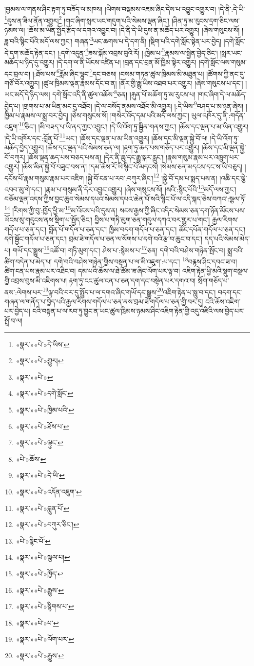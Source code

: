།བྱམས་ལ་གནས་ཤིང་རྟག་ཏུ་བཟོད་ལ་མཁས། །ལེགས་བསྡམས་འཇམ་ཞིང་དེས་པ་འབྱུང་འགྱུར་བ། །དེ་ནི་:དེ་ཡི་\footnote{«སྣར་»«པེ་»དེ་ཡིས་}དུས་ན་ཟིལ་ནོན་འགྱུར།\footnote{«སྣར་»«པེ་»གྱུར།} །གང་ཞིག་སླར་ཡང་གདུག་པའི་སེམས་ལྡན་ཞིང་། །ཤིན་ཏུ་མ་རུངས་དྲག་ཅིང་ལས་ཉམས་ལ། །ཆོས་མ་ཡིན་སྤྱོད་རྩོད་ལ་དགའ་འབྱུང་བ། །དེ་ནི་དེ་ཡི་དུས་ན་མཆོད་པར་འགྱུར། །ཞེས་གསུངས་སོ། །
ཟླ་བའི་སྙིང་པོའི་མདོ་ལས་ཀྱང་། གཞན་\footnote{«སྣར་»«པེ་»}ཡང་ཆགས་པ་དེ་དག་ནི། །སྡིག་པའི་དགེ་སློང་སྟེན་པར་བྱེད། །དགེ་སློང་དེ་དག་མཆོད་རྟེན་དང་། །:དགེ་འདུན་\footnote{«སྣར་»«པེ་»དགེ་སློང་}ཟས་སྐོམ་འབྲས་བུའི་རོ། །:ཁྱིམ་པ་\footnote{«སྣར་»«པེ་»ཁྱིམ་པའི་}རྣམས་ལ་སྦྱིན་བྱེད་ཅིང་། །སླར་ཡང་མཆོད་པ་ཉིད་དུ་འགྱུར། །དེ་དག་ལ་ནི་ཡོངས་འཛིན་པ། །བྲན་དང་བྲན་མོ་ཁྱིམ་སྟེར་འགྱུར། །དགེ་སློང་ལས་གསུམ་དང་བྲལ་བ། །:ཐོས་པས་\footnote{«སྣར་»«པེ་»ཐོས་པ་}རློམ་ཞིང་ལྷུང་\footnote{«སྣར་»«པེ་»ལྟུང་}དང་བཅས། །བསམ་གཏན་ཚུལ་ཁྲིམས་མི་མཐུན་པ། །ཚོགས་ཀྱི་ནང་དུ་གཙོ་བོར་འགྱུར། །ཚུལ་ཁྲིམས་ལྡན་རྣམས་དོང་བ་ན། །ནོར་གྱི་རྒྱུ་ཡིས་འཐབ་པར་འགྱུར། །ཞེས་གསུངས་པ་དང་། །ཡང་མདོ་དེ་ཉིད་ལས། དགེ་སློང་འདི་ནི་ཚུལ་འཆོས་\footnote{«པེ་»ཆོས་}ཅན། །རྐུན་པོ་མཆོག་ཏུ་མ་རུངས་པ། །གང་ཞིག་དེ་ལ་མཆོད་བྱེད་པ། །གྲགས་པ་མ་ཡིན་མང་དུ་འཐོབ། །དེ་ལ་བསོད་ནམས་འཐོབ་མི་འགྱུར། །:དེ་ཡིས་\footnote{«སྣར་»«པེ་»དེ་ཡི་}བཤད་པ་མ་ཉན་ཞེས། །ཁྱིམ་པ་རྣམས་ལ་སྨྲ་བར་བྱེད། །ཅེས་གསུངས་སོ། །གསེར་འོད་དམ་པའི་མདོ་ལས་ཀྱང་། ཡུལ་འཁོར་དུ་ནི་:གདོན་འཇུག་\footnote{«སྣར་»«པེ་»འདོན་འཇུག་}ཅིང་། །མི་བཟད་པ་ཡི་ནད་ཀྱང་འབྱུང་། །དེ་ཡི་འོག་ཏུ་སྦྱིན་གནས་ཀྱང་། །ཆོས་དང་ལྡན་པ་མ་ཡིན་འགྱུར། །དེ་ཡི་འཁོར་དང་:བློན་པོ་\footnote{«སྣར་»«པེ་»བླུན་པོ་}ཡང་། །ཆོས་དང་ལྡན་པ་མ་ཡིན་འགྱུར། །ཆོས་དང་མི་ལྡན་སྐྱེ་བོ་ལ། །དེ་ཡི་འོག་ཏུ་མཆོད་བྱེད་འགྱུར། །ཆོས་དང་ལྡན་པའི་སེམས་ཅན་ལ། །རྟག་ཏུ་ཆད་པས་གཅོད་པར་འགྱུར། །ཆོས་དང་མི་ལྡན་སྐྱེ་བོ་བཀུར། །ཆོས་ལྡན་ཆད་པས་བཅད་པས་ན། །དེར་ནི་ཆུ་དང་རྒྱུ་སྐར་རླུང་། །རྣམ་གསུམ་རྣམ་པར་འཁྲུག་པར་འགྱུར། །ཆོས་མིན་སྐྱེ་བོ་བཟུང་བས་ན། །དམ་ཆོས་རོ་ཡི་སྙིང་པོ་མདངས། །སེམས་ཅན་མདངས་དང་ས་ཡི་བཅུད། །དངོས་པོ་རྣམ་གསུམ་རྣམ་པར་འཇིག །སྐྱེ་བོ་ངན་པ་རབ་:བཀུར་ཞིང་།\footnote{«སྣར་»«པེ་»བཀུར་ཅིང་།} །སྐྱེ་བོ་དམ་པ་སྨད་པས་ན། །འཆི་དང་ལྕེ་འབབ་མུ་གེ་དང་། །རྣམ་པ་གསུམ་ནི་དེར་འབྱུང་འགྱུར། །ཞེས་གསུངས་སོ། །སའི་:སྙིང་པོའི་\footnote{«པེ་»སྙིང་པོ་}མདོ་ལས་ཀྱང་། བཅོམ་ལྡན་འདས་ཀྱིས་བྱང་ཆུབ་སེམས་དཔའ་སེམས་དཔའ་ཆེན་པོ་སའི་སྙིང་པོ་ལ་འདི་སྐད་ཅེས་བཀའ་:སྩལ་ཏོ།\footnote{«སྣར་»«པེ་»སྩལ་པ།} །རིགས་ཀྱི་བུ་:ཁྱོད་ཕྱི་མ་\footnote{«སྣར་»«པེ་»ཁྱོད་}མ་འོངས་པའི་དུས་ན། སངས་རྒྱས་ཀྱི་ཞིང་འདིར་སེམས་ཅན་དག་ཉོན་མོངས་པས་ཡོངས་སུ་གདུངས་ནས་སྡིག་པ་སྤྱོད་ཅིང་། བྱིས་པ་གཏི་མུག་ཅན་གདུལ་དཀའ་བར་གྱུར་པ་གང་། རྒྱལ་རིགས་གདོལ་པ་ཅན་དང་། བློན་པོ་གདོལ་པ་ཅན་དང་། ཁྱིམ་བདག་གདོལ་པ་ཅན་དང་། ཚོང་དཔོན་གདོལ་པ་ཅན་དང་། དགེ་སྦྱོང་གདོལ་པ་ཅན་དང་། བྲམ་ཟེ་གདོལ་པ་ཅན་ལ་སོགས་པ་དགེ་བའི་རྩ་བ་ཆུང་བ་དང་། དད་པའི་སེམས་མེད་པ། གཡོ་དང་སྒྱུས་\footnote{«སྣར་»«པེ་»རྒྱུས་}འཚོ་བ། གཏི་མུག་དང་། ཤེས་པ་:སྙེམས་པ་\footnote{«སྣར་»«པེ་»སྙིགས་པ་}ཅན། དགེ་བའི་བཤེས་གཉེན་སྤོང་བ། སྨྲ་བའི་ཚིག་བདེན་པ་མེད་པ། དགེ་བའི་བཤེས་གཉེན་གྱིས་བསྟན་པ་ལ་མི་འཇུག་:པ་དང་། \footnote{«སྣར་»«པེ་»པ་}བརྙས་ཤིང་དབང་ཟ་བ། ཚིག་ངན་པས་རྣམ་པར་འཐིང་བ། དམ་པའི་ཆོས་ལ་ཐེ་ཚོམ་ཟ་ཞིང་ལོག་པར་ལྟ་བ། འཇིག་རྟེན་ཕྱི་མའི་སྡུག་བསྔལ་གྱི་འབྲས་བུས་མི་འཇིགས་པ། རྟག་ཏུ་ངང་ཚུལ་ངན་པ་ཅན་དག་དང་བསྟེན་པར་དགའ་བ། སྲོག་གཅོད་པ་ནས་:ལེགས་པར་\footnote{«སྣར་»«པེ་»ལོག་པར་}ལྟ་བའི་བར་དུ་སྤྱོད་པ་ལ་དགའ་ཞིང་གཡོ་དང་སྒྱུས་\footnote{«སྣར་»«པེ་»རྒྱུས་}འཇིག་རྟེན་པ་སླུ་བ་དང་། བདག་དང་གཞན་ལ་གནོད་པ་བྱེད་པའི་རྒྱལ་རིགས་གདོལ་པ་ཅན་ནས་བྲམ་ཟེ་གདོལ་པ་ཅན་གྱི་བར་དུ། ངའི་ཆོས་འཇིག་པར་བྱེད་པ། ངའི་བསྟན་པ་ལ་རབ་ཏུ་བྱུང་ན་ཡང་ཚུལ་ཁྲིམས་ཉམས་ཤིང་འཇིག་རྟེན་གྱི་འདུ་འཛིའི་ལས་བྱེད་པར་སྤྲོ་བ་ལ། 